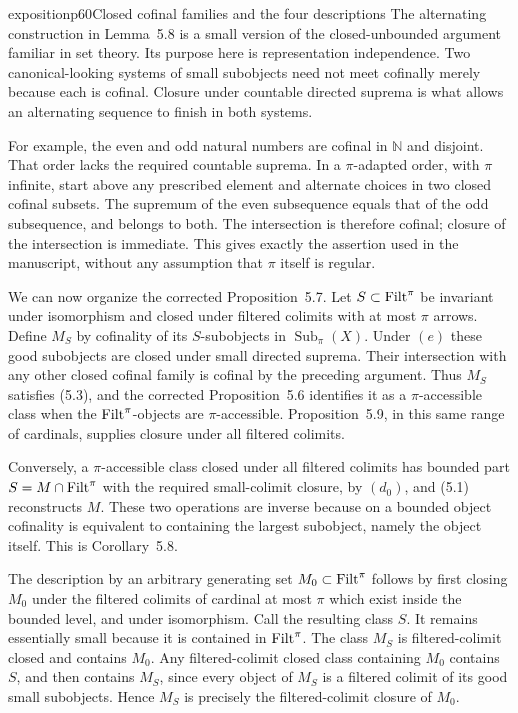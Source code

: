 \begin{dcomment}{exposition}{p60}{Closed cofinal families and the four descriptions}
The alternating construction in Lemma~5.8 is a small version of the closed-unbounded argument familiar in set theory. Its purpose here is representation independence. Two canonical-looking systems of small subobjects need not meet cofinally merely because each is cofinal. Closure under countable directed suprema is what allows an alternating sequence to finish in both systems.

For example, the even and odd natural numbers are cofinal in $\mathbb N$ and disjoint. That order lacks the required countable suprema. In a $\pi$-adapted order, with $\pi$ infinite, start above any prescribed element and alternate choices in two closed cofinal subsets. The supremum of the even subsequence equals that of the odd subsequence, and belongs to both. The intersection is therefore cofinal; closure of the intersection is immediate. This gives exactly the assertion used in the manuscript, without any assumption that $\pi$ itself is regular.

We can now organize the corrected Proposition~5.7. Let $S\subset\mathrm{Filt}^\pi$ be invariant under isomorphism and closed under filtered colimits with at most $\pi$ arrows. Define $M_S$ by cofinality of its $S$-subobjects in $\operatorname{Sub}_{\pi}(X)$. Under $(e)$ these good subobjects are closed under small directed suprema. Their intersection with any other closed cofinal family is cofinal by the preceding argument. Thus $M_S$ satisfies (5.3), and the corrected Proposition~5.6 identifies it as a $\pi$-accessible class when the $\mathrm{Filt}^\pi$-objects are $\pi$-accessible. Proposition~5.9, in this same range of cardinals, supplies closure under all filtered colimits.

Conversely, a $\pi$-accessible class closed under all filtered colimits has bounded part $S=M\cap\mathrm{Filt}^\pi$ with the required small-colimit closure, by $(d_0)$, and (5.1) reconstructs $M$. These two operations are inverse because on a bounded object cofinality is equivalent to containing the largest subobject, namely the object itself. This is Corollary~5.8.

The description by an arbitrary generating set $M_0\subset\mathrm{Filt}^\pi$ follows by first closing $M_0$ under the filtered colimits of cardinal at most $\pi$ which exist inside the bounded level, and under isomorphism. Call the resulting class $S$. It remains essentially small because it is contained in $\mathrm{Filt}^\pi$. The class $M_S$ is filtered-colimit closed and contains $M_0$. Any filtered-colimit closed class containing $M_0$ contains $S$, and then contains $M_S$, since every object of $M_S$ is a filtered colimit of its good small subobjects. Hence $M_S$ is precisely the filtered-colimit closure of $M_0$.


\end{dcomment}
